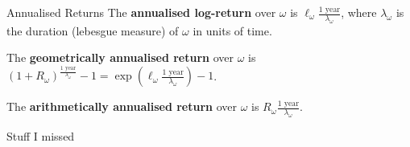 \documentclass{beamer}
\begin{document}
\begin{frame}{Annualised Returns}
	The \textbf{annualised log-return} over $\omega$ is $\ell_\omega \frac{\textrm{1 year}}{\lambda_\omega}$, where $\lambda_\omega$ is the duration (lebesgue measure) of $\omega$ in units of time.%

	The \textbf{geometrically annualised return} over $\omega$ is $(1 + R_\omega)^\frac{\textrm{1 year}}{\lambda_\omega} - 1 = \exp\left(\ell_\omega \frac{\textrm{1 year}}{\lambda_\omega}\right) - 1$.

	The \textbf{arithmetically annualised return} over $\omega$ is $R_\omega \frac{\textrm{1 year}}{\lambda_\omega}$. %

\end{frame}


\begin{frame}{Stuff I missed}
\end{frame}
\end{document}
